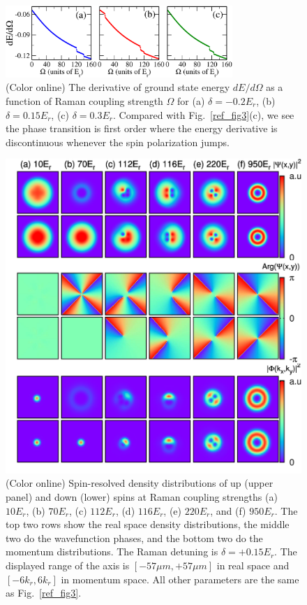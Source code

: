 \documentclass[twocolumn,pra,unsortedaddress,showpacs,floatfix,citeautoscript,nofootinbib]{revtex4-1}
\begin{document}
\begin{figure}[t]
\vspace{-0.2cm} \centering
\includegraphics[width=8.6cm]{Fig4.pdf}\vspace{-0.3cm}
\caption{(Color online) The derivative of ground state energy
$dE/d\Omega$ as a function of Raman coupling strength $\Omega$ for
(a) $\delta=-0.2E_r$, (b) $\delta=0.15E_r$, (c) $\delta=0.3E_r$.
Compared with Fig.~\ref{ref_fig3}(c), we see the phase transition
is first order where the energy derivative is discontinuous
whenever the spin polarization jumps.}\vspace{-0.4cm}
\label{ref_QPT}
\end{figure}

\begin{figure}[t!]
\vspace{-0.4cm}
 \centering
\includegraphics[width=14cm]{Fig5.pdf}\vspace{-0.7cm}
 \caption{(Color online) Spin-resolved density
distributions of up (upper panel) and down (lower) spins at Raman
coupling strengths (a) $10E_{r}$, (b) $70E_{r}$, (c) $112E_{r}$,
(d) $116E_{r}$, (e) $220E_{r}$, and (f) $950E_{r}$. The top two
rows show the real space density distributions, the middle two do
the wavefunction phases, and the bottom two do the momentum
distributions. The Raman detuning is $\delta =+0.15E_{r}$. The
displayed range of the axis is $[-57\mu m, +57\mu m]$ in real
space and $[-6k_r, 6k_r]$ in momentum space. All other parameters
are the same as Fig.~\ref{ref_fig3}.} \vspace{-0.4cm}
\label{xspace}
\end{figure}
\end{document}

